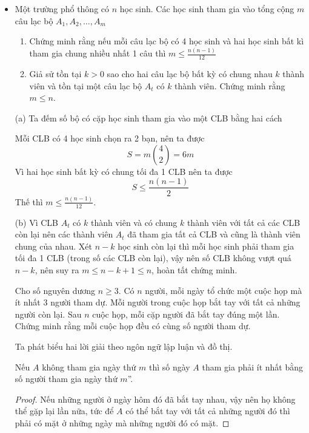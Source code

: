 \documentclass[11pt]{scrartcl}
\begin{document}
\begin{itemize}[label=, leftmargin=0em, itemsep=0.5em]
    \item \begin{bt}
        Một trường phổ thông có $n$ học sinh. Các học sinh tham gia vào tổng cộng $m$ câu lạc bộ $A_1,A_2,\dots,A_m$
        \begin{enumerate}[label=(\alph*)]
            \item Chứng minh rằng nếu mỗi câu lạc bộ có 4 học sinh và hai học sinh bất kì tham gia chung nhiều nhất 1 câu thì $m \leq \frac{n(n - 1)}{12}$
            \item Giả sử tồn tại $k > 0$ sao cho hai câu lạc bộ bất kỳ có chung nhau $k$ thành viên và tồn tại một câu lạc bộ $A_t$ có $k$ thành viên. Chứng minh rằng $m \leq n$.
        \end{enumerate}
    \end{bt}
    \begin{sol}

        (a) Ta đếm số bộ có cặp học sinh tham gia vào một CLB bằng hai cách 

         Mỗi CLB có 4 học sinh chọn ra 2 bạn, nên ta được 
        \[
            S = m\binom{4}{2} = 6m 
        \]
         Vì hai học sinh bất kỳ có chung tối đa 1 CLB nên ta được 
        \[
            S \leq \frac{n(n - 1)}{2}
        \]
        Thế thì $m \leq \frac{n(n - 1)}{12}$.

        (b) Vì CLB $A_t$ có $k$ thành viên và có chung $k$ thành viên với tất cả các CLB còn lại nên các thành viên $A_t$ đã tham gia tất cả CLB và cũng là thành viên chung của nhau. Xét $n - k$ học sinh còn lại thì mỗi học sinh phải tham gia tối đa 1 CLB (trong số các CLB còn lại), vậy nên số CLB không vượt quá $n - k$, nên suy ra $m \leq n - k + 1 \leq n$, hoàn tất chứng minh.
        
    \end{sol}
    \begin{bt}
        Cho số nguyên dương $n \geq 3$. Có $n$ người, mỗi ngày tổ chức một cuộc họp mà ít nhất 3 người tham dự. Mỗi người trong cuộc họp bắt tay với tất cả những người còn lại. Sau $n$ cuộc họp, mỗi cặp người đã bắt tay đúng một lần. Chứng minh rằng mỗi cuộc họp đều có cùng số người tham dự.
    \end{bt}
    Ta phát biểu hai lời giải theo ngôn ngữ lập luận và đồ thị. 
    \begin{sol}

         Nếu $A$ không tham gia ngày thứ $m$ thì số ngày $A$ tham gia phải ít nhất bằng số người tham gia ngày thứ $m$''. 
        \begin{proof}
            Nếu những người ở ngày hôm đó đã bắt tay nhau, vậy nên họ không thể gặp lại lần nữa, tức để $A$ có thể bắt tay với tất cả những người đó thì phải có mặt ở những ngày mà những người đó có mặt.
        \end{proof}
        

\end{sol}
\end{itemize}
\end{document}

